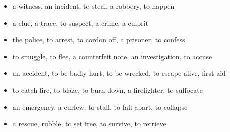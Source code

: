 \begin{itemize}
\raggedright
  \item a witness, an incident, to steal, a robbery, to happen
  \item a clue, a trace, to suspect, a crime, a culprit
  \item the police, to arrest, to cordon off, a prisoner, to confess
  \item to smuggle, to flee, a counterfeit note, an investigation, to accuse
  \item an accident, to be badly hurt, to be wrecked, to escape alive, first aid
  \item to catch fire, to blaze, to burn down, a firefighter, to suffocate
  \item an emergency, a curfew, to stall, to fall apart, to collapse
  \item a rescue, rubble, to set free, to survive, to retrieve
\end{itemize}

